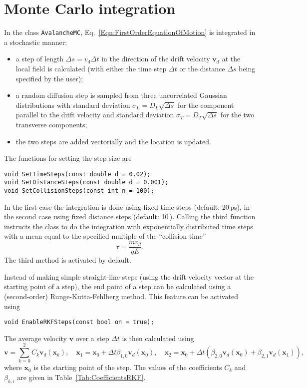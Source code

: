\section{Monte Carlo integration}\label{Sec:DriftLineMC}
In the class \texttt{AvalancheMC}, Eq.~\eqref{Eqn:FirstOrderEquationOfMotion}
is integrated in a stochastic manner:
\begin{itemize}
  \item
  a step of length \(\Delta{s} = v_{\text{d}}\Delta{t}\) 
  in the direction of the
  drift velocity \(\mathbf{v}_{\text{d}}\) 
  at the local field is calculated (with either the 
  time step \(\Delta{t}\) or the distance \(\Delta{s}\) 
  being specified by the user);
  \item
   a random diffusion step
   is sampled from three uncorrelated Gaussian distributions
   with standard deviation \(\sigma_{L} = D_{L}\sqrt{\Delta{s}}\)
   for the component parallel to the drift velocity and
   standard deviation
   \(\sigma_{T} = D_{T}\sqrt{\Delta{s}}\) for the two
   transverse components;
   \item
   the two steps are added vectorially and the location is updated.
\end{itemize}
The functions for setting the step size are 
\begin{lstlisting}
void SetTimeSteps(const double d = 0.02);
void SetDistanceSteps(const double d = 0.001);
void SetCollisionSteps(const int n = 100);
\end{lstlisting} 
In the first case the integration is done 
using fixed time steps (default: 20\,ps), 
in the second case using fixed distance steps (default: 10\,). 
Calling the third function instructs the class to 
do the integration with exponentially distributed time steps 
with a mean equal to the specified multiple of the ``collision time'' 
\begin{equation*}
  \tau = \frac{m v_{d}}{q E}.
\end{equation*}
The third method is activated by default.

Instead of making simple straight-line steps (using the drift velocity 
vector at the starting point of a step), the end point of a step 
can be calculated using a (second-order) Runge-Kutta-Fehlberg method. 
This feature can be activated using
\begin{lstlisting}
void EnableRKFSteps(const bool on = true); 
\end{lstlisting}
The average velocity $\mathbf{v}$ over a step $\Delta{t}$ is then 
calculated using
\begin{equation*}
\mathbf{v} = \sum\limits_{k=0}^{2}C_{k}\mathbf{v}_{d}\left(\mathbf{x}_{k}\right), \quad 
\mathbf{x}_{1} = \mathbf{x}_{0} + \Delta{t}\beta_{1,0}\mathbf{v}_{d}\left(\mathbf{x}_{0}\right), \quad 
\mathbf{x}_{2} = \mathbf{x}_{0} + \Delta{t}\left(\beta_{2,0}\mathbf{v}_{d}\left(\mathbf{x}_{0}\right) + \beta_{2,1}\mathbf{v}_{d}\left(\mathbf{x}_{1}\right)\right),
\end{equation*}
where $\mathbf{x}_{0}$ is the starting point of the step. The values of the 
coefficients $C_{k}$ and $\beta_{k,i}$ are given in 
Table~\ref{Tab:CoefficientsRKF}.

